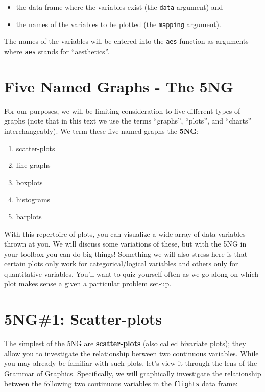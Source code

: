 \documentclass[]{tufte-book}
\providecommand{\tightlist}{%
  \setlength{\itemsep}{0pt}\setlength{\parskip}{0pt}}
\theoremstyle{definition}
\theoremstyle{definition}
\theoremstyle{remark}
\begin{document}
\begin{itemize}
\tightlist
\item
  the data frame where the variables exist (the \texttt{data} argument)
  and
\item
  the names of the variables to be plotted (the \texttt{mapping}
  argument).
\end{itemize}

The names of the variables will be entered into the \texttt{aes}
function as arguments where \texttt{aes} stands for ``aesthetics''.

\section{Five Named Graphs - The 5NG}\label{five-named-graphs---the-5ng}

For our purposes, we will be limiting consideration to five different
types of graphs (note that in this text we use the terms ``graphs'',
``plots'', and ``charts'' interchangeably). We term these five named
graphs the \textbf{5NG}:

\begin{enumerate}
\def\labelenumi{\arabic{enumi}.}
\tightlist
\item
  scatter-plots
\item
  line-graphs
\item
  boxplots
\item
  histograms
\item
  barplots
\end{enumerate}

With this repertoire of plots, you can visualize a wide array of data
variables thrown at you. We will discuss some variations of these, but
with the 5NG in your toolbox you can do big things! Something we will
also stress here is that certain plots only work for categorical/logical
variables and others only for quantitative variables. You'll want to
quiz yourself often as we go along on which plot makes sense a given a
particular problem set-up.

\section{5NG\#1: Scatter-plots}\label{scatterplots}

The simplest of the 5NG are \textbf{scatter-plots} (also called
bivariate plots); they allow you to investigate the relationship between
two continuous variables. While you may already be familiar with such
plots, let's view it through the lens of the Grammar of Graphics.
Specifically, we will graphically investigate the relationship between
the following two continuous variables in the \texttt{flights} data
frame:
\end{document}
